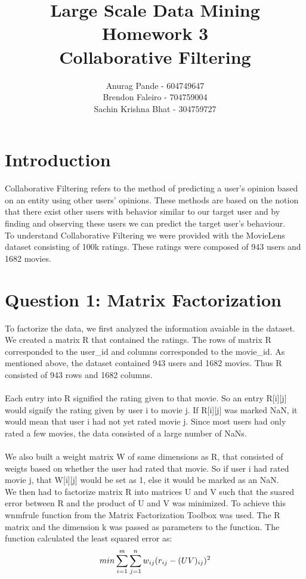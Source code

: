 \documentclass[12pt, onecolumn]{IEEEtran}
\begin{document}
\title{\Large \bf Large Scale Data Mining\\ Homework 3\\Collaborative Filtering}
\author{
{\rm Anurag Pande - 604749647}\\
{\rm Brendon Faleiro - 704759004}\\
{\rm Sachin Krishna Bhat - 304759727}
}

\maketitle
\section{Introduction}
Collaborative Filtering refers to the method of predicting a user's opinion based on an entity using other users' opinions. These methods are based on the notion that there exist other users with behavior similar to our target user and by finding and observing these users we can predict the target user's behaviour.\\
To understand Collaborative Filtering we were provided with the MovieLens dataset consisting of 100k ratings. These ratings were composed of 943 users and 1682 movies.\\
\section*{Question 1: Matrix Factorization}
To factorize the data, we first analyzed the information avaiable in the dataset. We created a matrix R that contained the ratings. The rows of matrix R corresponded to the user\_id and columns corresponded to the movie\_id. As mentioned above, the dataset contained 943 users and 1682 movies. Thus R consisted of 943 rows and 1682 columns.\\
\\
Each entry into R signified the rating given to that movie. So an entry R[i][j] would signify the rating given by user i to movie j. If R[i][j] was marked NaN, it would mean that user i had not yet rated movie j. Since most users had only rated a few movies, the data consisted of a large number of NaNs.\\
\\
We also built a weight matrix W of same dimensions as R, that consisted of weigts based on whether the user had rated that movie. So if user i had rated movie j, that W[i][j] would be set as 1, else it would be marked as an NaN.  \\
We then had to factorize matrix R into matrices U and V such that the suared error between R and the product of U and V was minimized. To achieve this wnmfrule function from the Matrix Factorization Toolbox\cite{wnmfrule} was used. The R matrix and the dimension k was passed as parameters to the function. The function calculated the least squared error as:\\
\begin{equation}
\centering
min \sum\limits_{i=1}^m \sum\limits_{j=1}^n  w_{ij}(r_{ij} - (UV)_{ij})^2
\end{equation}
\end{document}
